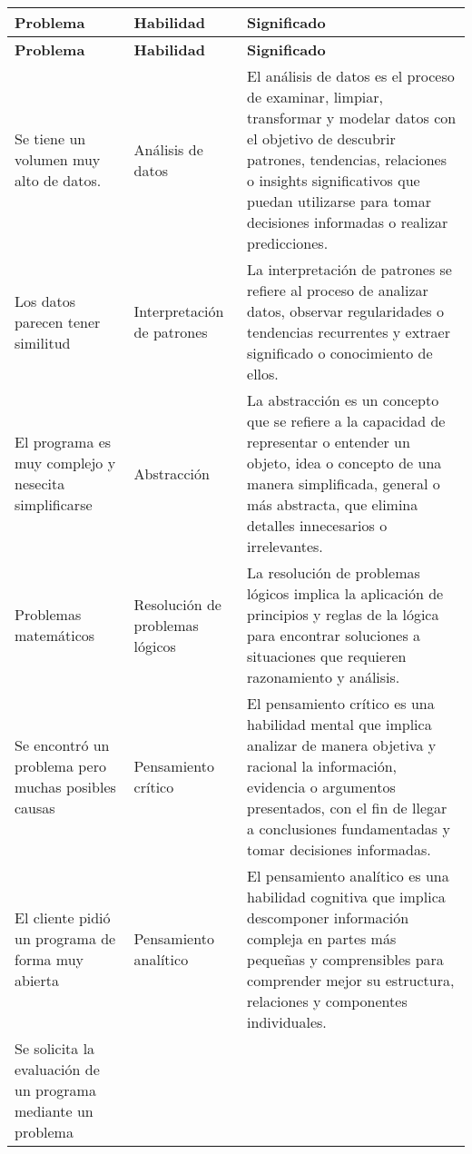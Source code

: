 \begin{longtable}{|p{6cm}|p{3cm}|p{8cm}|}
\hline
\textbf{Problema}  & \textbf{Habilidad} & \textbf{Significado}  \\ 
\hline
\endfirsthead
\hline
\textbf{Problema}  & \textbf{Habilidad} & \textbf{Significado}  \\ 
\hline
\endhead
\hline
\endfoot

Se tiene un volumen muy alto de datos.&  Análisis de datos & El análisis de datos es el proceso de examinar, limpiar, transformar y modelar datos con el objetivo de descubrir patrones, tendencias, relaciones o insights significativos que puedan utilizarse para tomar decisiones informadas o realizar predicciones. 

 \\ 
 \hline
Los datos parecen tener similitud
&
Interpretación de patrones
 & 
La interpretación de patrones se refiere al proceso de analizar datos, observar regularidades o tendencias recurrentes y extraer significado o conocimiento de ellos.

\\ 
 \hline
El programa es muy complejo y nesecita simplificarse &
Abstracción
 & 
La abstracción es un concepto que se refiere a la capacidad de representar o entender un objeto, idea o concepto de una manera simplificada, general o más abstracta, que elimina detalles innecesarios o irrelevantes. 

\\ 
\hline
Problemas matemáticos
&
Resolución de problemas lógicos
 & 
La resolución de problemas lógicos implica la aplicación de principios y reglas de la lógica para encontrar soluciones a situaciones que requieren razonamiento y análisis.
\\ 
\hline

Se encontró un problema pero muchas posibles causas

&
Pensamiento crítico & 
El pensamiento crítico es una habilidad mental que implica analizar de manera objetiva y racional la información, evidencia o argumentos presentados, con el fin de llegar a conclusiones fundamentadas y tomar decisiones informadas. 


\\
\hline
El cliente pidió un programa de forma muy abierta


&
Pensamiento analítico & 
El pensamiento analítico es una habilidad cognitiva que implica descomponer información compleja en partes más pequeñas y comprensibles para comprender mejor su estructura, relaciones y componentes individuales.
\\
\hline
Se solicita la evaluación de un programa mediante un problema



\end{longtable}
